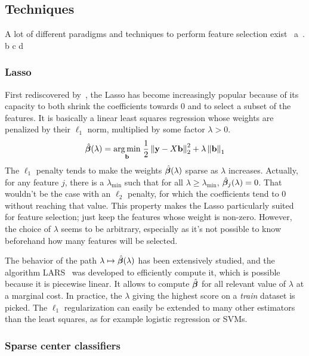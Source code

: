 \subsection{Techniques}\label{subsec:fst}

A lot of different paradigms and techniques to perform feature selection exist~\cite{intro_fs}
a~\cite{fs_text_classification}.
b\cite{gene_selection_cancer_svm}
c\cite{fs_for_classification}
d\cite{fs_for_classification_a_review}

\subsubsection{Lasso}\label{subsubsec:lasso}

First rediscovered by~\cite{lasso},
the Lasso has become increasingly popular because of its capacity to both shrink
the coefficients towards 0 and to select a subset of the features.
It is basically a linear least squares regression whose weights are penalized by their $\ell_1$ norm,
multiplied by some factor $\lambda > 0$.
%
\begin{equation}\label{eq:lasso}
    \hat{\bm{\beta}}(\lambda) =
    \underset{\mathbf{b}}{\operatorname*{arg\,min}}\;
    \frac{1}{2}\left\lVert\mathbf{y} - X\mathbf{b}\right\rVert_2^2 + \lambda\left\lVert\mathbf{b}\right\rVert_1
\end{equation}
%
The $\ell_1$ penalty tends to make the weights $\hat{\bm{\beta}}(\lambda)$ sparse as $\lambda$ increases.
Actually, for any feature $j$,
there is a $\lambda_{\min}$ such that for all $\lambda \geq \lambda_{\min}$,
$\hat{\bm{\beta}}_j(\lambda) = 0$.
That wouldn't be the case with an $\ell_2$ penalty,
for which the coefficients tend to $0$ without reaching that value.
This property makes the Lasso particularly suited for feature selection;
just keep the features whose weight is non-zero.
However, the choice of $\lambda$ seems to be arbitrary,
especially as it's not possible to know beforehand how many features will be selected.

The behavior of the path $\lambda \mapsto \hat{\bm{\beta}}(\lambda)$ has been extensively studied,
and the algorithm LARS~\cite{lars} was developed to efficiently compute it,
which is possible because it is piecewise linear.
It allows to compute $\hat{\bm{\beta}}$ for all relevant value of $\lambda$ at a marginal cost.
In practice, the $\lambda$ giving the highest score on a \emph{train} dataset is picked.
The $\ell_1$ regularization can easily be extended to many other estimators than the least squares,
as for example logistic regression or SVMs.

\subsubsection{Sparse center classifiers}

